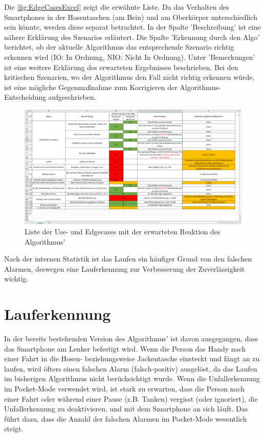 Die \autoref{fig:EdgeCasesExcel} zeigt die erwähnte Liste. Da das Verhalten des Smartphones in der Hosentaschen (am Bein) und am Oberkörper unterschiedlich sein könnte, werden diese separat betrachtet. In der Spalte 'Beschreibung' ist eine nähere Erklärung des Szenarios erläutert. Die Spalte 'Erkennung durch den Algo' berichtet, ob der aktuelle Algorithmus das entsprechende Szenario richtig erkennen wird (IO: In Ordnung, NIO: Nicht In Ordnung). Unter 'Bemerkungen' ist eine weitere Erklärung des erwarteten Ergebnisses beschrieben. Bei den kritischen Szenarien, wo der Algorithmus den Fall nicht richtig erkennen würde, ist eine mögliche Gegenmaßnahme zum Korrigieren der Algorithmus-Entscheidung aufgeschrieben.
\begin{figure}[H]
	\centering
	\includegraphics[width=\linewidth]{Bilder/EdgeCasesExcel.png}
	\caption{Liste der Use- und Edgecases mit der erwarteten Reaktion des Algorithmus'}
	\label{fig:EdgeCasesExcel}
\end{figure}

Nach der internen Statistik ist das Laufen ein häufiger Grund von den falschen Alarmen, deswegen eine Lauferkennung zur Verbesserung der Zuverlässigkeit wichtig.

\section{Lauferkennung} \label{sec:Lauferkennung}
In der bereits bestehenden Version des Algorithmus' ist davon ausgegangen, dass das Smartphone am Lenker befestigt wird. Wenn die Person das Handy nach einer Fahrt in die Hosen- beziehungsweise Jackentasche einsteckt und fängt an zu laufen, wird öfters einen falschen Alarm (falsch-positiv) ausgelöst, da das Laufen im bisherigen Algorithmus nicht berücksichtigt wurde.
Wenn die Unfallerkennung im Pocket-Mode verwendet wird, ist stark zu erwarten, dass die Person nach einer Fahrt oder während einer Pause (z.B. Tanken) vergisst (oder ignoriert), die Unfallerkennung zu deaktivieren, und mit dem Smartphone an sich läuft. Das führt dazu, dass die Anzahl der falschen Alarmen im Pocket-Mode wesentlich steigt.

